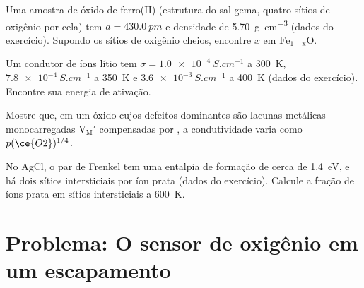 \begin{exercise}[$\star\star$]\label{exo:b3:solid-state:9}
Uma amostra de óxido de ferro(II) (estrutura do sal-gema, quatro sítios de oxigênio por cela) tem
$a = \qty{430.0}{pm}$ e densidade de \qty{5.70}{g.cm^{-3}} (dados do exercício). Supondo
os sítios de oxigênio cheios, encontre $x$ em $\mathrm{Fe_{1-x}O}$.
\end{exercise}

\begin{exercise}[$\star\star\star$]\label{exo:b3:solid-state:10}
Um condutor de íons lítio tem $\sigma = \qty{1.0e-4}{S.cm^{-1}}$ a \qty{300}{K}, $\qty{7.8e-4}{S.cm^{-1}}$ a \qty{350}{K} e
$\qty{3.6e-3}{S.cm^{-1}}$ a \qty{400}{K} (dados do exercício). Encontre sua energia de ativação.
\end{exercise}

\begin{exercise}[$\star\star\star$]\label{exo:b3:solid-state:11}
Mostre que, em um óxido cujos defeitos dominantes são lacunas metálicas monocarregadas
$\mathrm{V_M'}$ compensadas por , a condutividade varia como $p(\ce{O2})^{1/4}$.
\end{exercise}

\begin{exercise}[$\star\star\star$]\label{exo:b3:solid-state:12}
No AgCl, o par de Frenkel tem uma entalpia de formação de cerca de \qty{1.4}{eV}, e há
dois sítios intersticiais por íon prata (dados do exercício). Calcule a fração
de íons prata em sítios intersticiais a \qty{600}{K}.
\end{exercise}

\section{Problema: O sensor de oxigênio em um escapamento}

